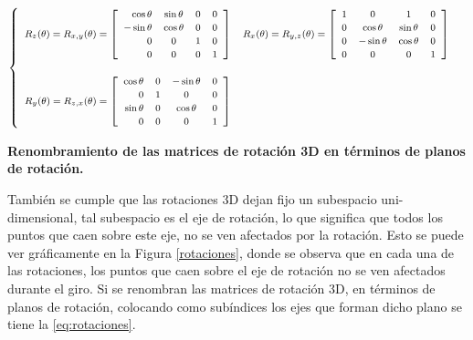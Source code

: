\begin{equation}
\label{eq:rotaciones}
\footnotesize{
   \begin{cases}
   \begin{array}{rccl}
    
    R_z(\theta) = R_{x,y}(\theta)
    =
    \left[
    \begin{array}{rccl}
    \cos\theta & \sin\theta & 0 & 0\\
    -\sin\theta & \cos\theta & 0  &  0\\
    0 & 0 & 1 & 0 \\
    0 & 0 & 0 & 1\\
    \end{array}
    \right]
   
    &
    R_x(\theta) = R_{y,z}(\theta)
    =
    \left[
    \begin{array}{rccl}
    1 & 0 & 1 & 0\\
    0 & \cos\theta & \sin\theta &  0\\
    0 & -\sin\theta & \cos\theta & 0 \\
    0 & 0 & 0 & 1\\
    \end{array}
    \right]
    \\ \\
    R_y(\theta) = R_{z,x}(\theta)
    =
    \left[
    \begin{array}{rccl}
    \cos\theta & 0 & -\sin\theta & 0\\
    0 & 1 & 0 &  0\\
    \sin\theta & 0 & \cos\theta & 0 \\
    0 & 0 & 0 & 1\\
    \end{array}
    \right]
    
    \end{array}
\end{cases}
}
\end{equation}


\begin{center}
\caption{\footnotesize{\textbf{Renombramiento de las matrices de rotación 3D en términos de planos de rotación.}}}
\end{center}
    
También se cumple que las rotaciones 3D dejan fijo un subespacio uni-dimensional, 
tal subespacio es el eje de rotación, lo que significa que todos los puntos que 
caen sobre este eje, no se ven afectados por la rotación. Esto se puede ver 
gráficamente en la Figura \ref{rotaciones}, donde se observa que en cada una 
de las rotaciones, los puntos que caen sobre el eje de rotación no se ven afectados 
durante el giro. Si se renombran las matrices de rotación 3D, en términos de planos 
de rotación, colocando como subíndices los ejes que forman dicho plano se tiene la \ref{eq:rotaciones}.

